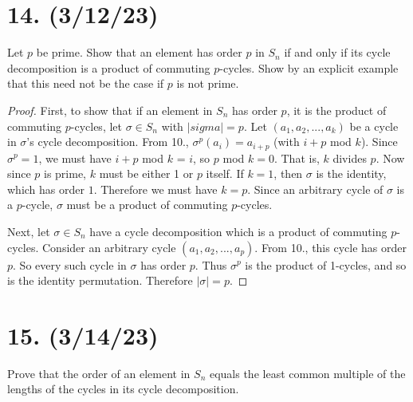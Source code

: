 \documentclass{article}
\begin{document}
\section*{14. (3/12/23)}

Let $p$ be prime. Show that an element has order $p$ in $S_n$ if and only if its cycle decomposition is a product of commuting $p$-cycles. Show by an explicit example that this need not be the case if $p$ is not prime.

\begin{proof}
    First, to show that if an element in $S_n$ has order $p$, it is the product of commuting $p$-cycles, let $\sigma \in S_n$ with $|sigma| = p$. Let $(a_1, a_2, ..., a_k)$ be a cycle in $\sigma$'s cycle decomposition. From 10., $\sigma^p(a_i) = a_{i + p}$ (with $i + p$ mod $k$). Since $\sigma^p = 1$, we must have $i + p$ mod $k$ = $i$, so $p$ mod $k = 0$. That is, $k$ divides $p$. Now since $p$ is prime, $k$ must be either 1 or $p$ itself. If $k = 1$, then $\sigma$ is the identity, which has order $1$. Therefore we must have $k = p$. Since an arbitrary cycle of $\sigma$ is a $p$-cycle, $\sigma$ must be a product of commuting $p$-cycles.

    Next, let $\sigma \in S_n$ have a cycle decomposition which is a product of commuting $p$-cycles. Consider an arbitrary cycle $(a_1, a_2, ..., a_p)$. From 10., this cycle has order $p$. So every such cycle in $\sigma$ has order $p$. Thus $\sigma^p$ is the product of 1-cycles, and so is the identity permutation. Therefore $|\sigma| = p$.
\end{proof}

\section*{15. (3/14/23)}

Prove that the order of an element in $S_n$ equals the least common multiple of the lengths of the cycles in its cycle decomposition.
\end{document}
